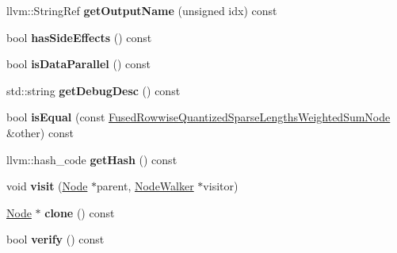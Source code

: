 \begin{DoxyCompactItemize}
\item 
\mbox{\label{classglow_1_1_fused_rowwise_quantized_sparse_lengths_weighted_sum_node_afdbae90d3b5031eea909271b61c56ced}} 
llvm\+::\+String\+Ref {\bfseries get\+Output\+Name} (unsigned idx) const
\item 
\mbox{\label{classglow_1_1_fused_rowwise_quantized_sparse_lengths_weighted_sum_node_a9f414364b9141db8ca7211fed16cbf6e}} 
bool {\bfseries has\+Side\+Effects} () const
\item 
\mbox{\label{classglow_1_1_fused_rowwise_quantized_sparse_lengths_weighted_sum_node_ac603e681d66f15105fed3e2eae1e4a62}} 
bool {\bfseries is\+Data\+Parallel} () const
\item 
\mbox{\label{classglow_1_1_fused_rowwise_quantized_sparse_lengths_weighted_sum_node_a79985e050d1ffa6a6f864ee0c6695251}} 
std\+::string {\bfseries get\+Debug\+Desc} () const
\item 
\mbox{\label{classglow_1_1_fused_rowwise_quantized_sparse_lengths_weighted_sum_node_a3fedc54d97956e640cfad45603e64861}} 
bool {\bfseries is\+Equal} (const \hyperlink{classglow_1_1_fused_rowwise_quantized_sparse_lengths_weighted_sum_node}{Fused\+Rowwise\+Quantized\+Sparse\+Lengths\+Weighted\+Sum\+Node} \&other) const
\item 
\mbox{\label{classglow_1_1_fused_rowwise_quantized_sparse_lengths_weighted_sum_node_a8b135c2a121056ce5d863429478ceca9}} 
llvm\+::hash\+\_\+code {\bfseries get\+Hash} () const
\item 
\mbox{\label{classglow_1_1_fused_rowwise_quantized_sparse_lengths_weighted_sum_node_a1cca8e798ea3bfd8321319d12e9a9ed4}} 
void {\bfseries visit} (\hyperlink{classglow_1_1_node}{Node} $\ast$parent, \hyperlink{classglow_1_1_node_walker}{Node\+Walker} $\ast$visitor)
\item 
\mbox{\label{classglow_1_1_fused_rowwise_quantized_sparse_lengths_weighted_sum_node_a7b0faf111b869b36dad1e1da2e1e5700}} 
\hyperlink{classglow_1_1_node}{Node} $\ast$ {\bfseries clone} () const
\item 
\mbox{\label{classglow_1_1_fused_rowwise_quantized_sparse_lengths_weighted_sum_node_ac1900f2383c87522c8eba7e13628211a}} 
bool {\bfseries verify} () const
\end{DoxyCompactItemize}
